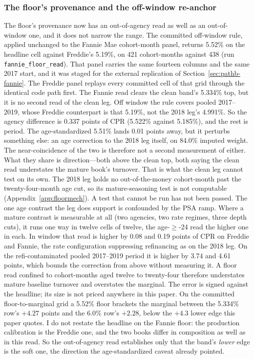 \documentclass[12pt]{article}
\begin{document}
\subsubsection{The floor's provenance and the off-window re-anchor}

The floor's provenance now has an out-of-agency read as well as an out-of-window one, and it does not narrow the range. The committed off-window rule, applied unchanged to the Fannie Mae cohort-month panel, returns 5.52\% on the headline cell against Freddie's 5.19\%, on 421 cohort-months against 438 (run \texttt{fannie\_floor\_read}). That panel carries the same fourteen columns and the same 2017 start, and it was staged for the external replication of Section~\ref{sec:pathb-fannie}. The Freddie panel replays every committed cell of that grid through the identical code path first. The Fannie read clears the clean band's 5.334\% top, but it is no second read of the clean leg. Off window the rule covers pooled 2017--2019, whose Freddie counterpart is that 5.19\%, not the 2018 leg's 4.991\%. So the agency difference is 0.337 points of CPR (5.522\% against 5.185\%), and the rest is period. The age-standardized 5.51\% lands 0.01 points away, but it perturbs something else: an age correction to the 2018 leg itself, on 84.0\% imputed weight. The near-coincidence of the two is therefore not a second measurement of either. What they share is direction---both above the clean top, both saying the clean read understates the mature book's turnover. That is what the clean leg cannot test on its own. The 2018 leg holds no out-of-the-money cohort-month past the twenty-four-month age cut, so its mature-seasoning test is not computable (Appendix~\ref{app:floormech}). A test that cannot be run has not been passed. The one age contrast the leg does support is confounded by the PSA ramp. Where a mature contrast is measurable at all (two agencies, two rate regimes, three depth cuts), it runs one way in twelve cells of twelve, the age-$\geq$-24 read the higher one in each. In window that read is higher by 0.08 and 0.19 points of CPR on Freddie and Fannie, the rate configuration suppressing refinancing as on the 2018 leg. On the refi-contaminated pooled 2017--2019 period it is higher by 3.74 and 4.61 points, which bounds the correction from above without measuring it. A floor read confined to cohort-months aged twelve to twenty-four therefore understates mature baseline turnover and overstates the marginal. The error is signed against the headline; its size is not priced anywhere in this paper. On the committed floor-to-marginal grid a 5.52\% floor brackets the marginal between the 5.334\% row's $+4.27$ points and the 6.0\% row's $+2.28$, below the $+4.3$ lower edge this paper quotes. I do not restate the headline on the Fannie floor: the production calibration is the Freddie one, and the two books differ in composition as well as in this read. So the out-of-agency read establishes only that the band's \emph{lower} edge is the soft one, the direction the age-standardized caveat already pointed.
\end{document}
